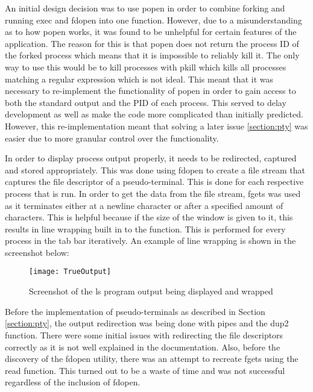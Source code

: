 An initial design decision was to use {\selectfont popen}\cite{popen} in order to combine forking and running {\selectfont exec} and {\selectfont fdopen}\cite{fdopen} into one function. However, due to a misunderstanding as to how {\selectfont popen} works, it was found to be unhelpful for certain features of the application. The reason for this is that {\selectfont popen} does not return the process ID of the forked process which means that it is impossible to reliably kill it. The only way to use this would be to kill processes with {\selectfont pkill}\cite{pkill} which kills all processes matching a regular expression which is not ideal. This meant that it was necessary to re-implement the functionality of {\selectfont popen} in order to gain access to both the standard output and the {\selectfont PID} of each process. This served to delay development as well as make the code more complicated than initially predicted. However, this re-implementation meant that solving a later issue \ref{section:pty} was easier due to more granular control over the functionality.

In order to display process output properly, it needs to be redirected, captured and stored appropriately. This was done using {\selectfont fdopen} to create a file stream that captures the file descriptor of a pseudo-terminal. This is done for each respective process that is run. In order to get the data from the file stream, {\selectfont fgets} was used as it terminates either at a newline character or after a specified amount of characters. This is helpful because if the size of the window is given to it, this results in line wrapping built in to the function. This is performed for every process in the tab bar iteratively. An example of line wrapping is shown in the screenshot below:

\begin{figure}[h!]
  \centering
  \texttt{[image: TrueOutput]}
  \caption{Screenshot of the {\selectfont ls} program output being displayed and wrapped}
  \label{fig:output}
\end{figure}

Before the implementation of pseudo-terminals as described in Section \ref{section:pty}, the output redirection was being done with pipes and the {\selectfont dup2} function. There were some initial issues with redirecting the file descriptors correctly as it is not well explained in the documentation. Also, before the discovery of the {\selectfont fdopen} utility, there was an attempt to recreate {\selectfont fgets} using the read function. This turned out to be a waste of time and was not successful regardless of the inclusion of {\selectfont fdopen}.


